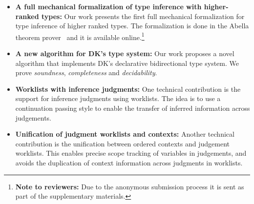 \begin{itemize}

\item {\bf A full mechanical formalization of type inference with
  higher-ranked types:} Our work presents the first full mechanical formalization
  for type inference of higher ranked types. The formalization is done in the
  Abella theorem prover~\cite{AbellaDesc} and it is available
  online.\footnote{{\bf Note to reviewers:} Due to the anonymous submission process
  it is sent as part of the supplementary materials.}

\item {\bf A new algorithm for DK's type system:} Our work proposes a novel algorithm that implements
  DK's declarative bidirectional type system. We prove
  \emph{soundness}, \emph{completeness} and
  \emph{decidability}. 

\item {\bf Worklists with inference judgments:} One technical contribution is the
  support for inference judgments using worklists. The idea is to
  use a continuation passing style to enable the transfer of inferred information across
  judgements. 

\item {\bf Unification of judgment worklists and contexts:} Another technical contribution is the unification
  between ordered contexts and judgement worklists. This enables precise scope tracking
  of variables in judgements, and avoids the duplication of context information across
  judgments in worklists.

\begin{comment}
\jimmy{Notes @20190211 4 points of novalty:\\
1) Dealing with inference judgements and CPS-style chains\\
2) The form of the judgment itself with a single shared context\\
3) The way we deal with scope (which may follow from 2)\\
4) Immediate substitution (judgment list)
}
\end{comment}

\end{itemize}
